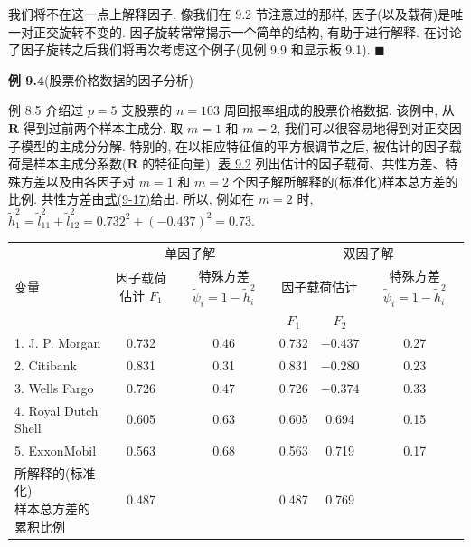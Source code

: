 
我们将不在这一点上解释因子. 像我们在 9.2 节注意过的那样, 因子(以及载荷)是唯一对正交旋转不变的. 因子旋转常常揭示一个简单的结构, 有助于进行解释. 在讨论了因子旋转之后我们将再次考虑这个例子(见例 9.9 和显示板 9.1). \hfill$\blacksquare$

\noindent\textbf{例 9.4}\quad (股票价格数据的因子分析)

例 8.5 介绍过 $p=5$ 支股票的 $n=103$ 周回报率组成的股票价格数据. 该例中, 从 $\mathbf{R}$ 得到过前两个样本主成分. 取 $m=1$ 和 $m=2$, 我们可以很容易地得到对正交因子模型的主成分分解. 特别的, 在以相应特征值的平方根调节之后, 被估计的因子载荷是样本主成分系数($\mathbf{R}$ 的特征向量). \hyperref[tab:9.2]{表 9.2} 列出估计的因子载荷、共性方差、特殊方差以及由各因子对 $m=1$ 和 $m=2$ 个因子解所解释的(标准化)样本总方差的比例. 共性方差由\hyperref[eq:9-17]{式(9-17)}给出. 所以, 例如在 $m=2$ 时, $\tilde{h}_1^2=\tilde{l}_{11}^2+\tilde{l}_{12}^2=0.732^2+(-0.437)^2=0.73$.

\begin{mvtable}
\label{tab:9.2}
\begin{tabular}{lccccc}
\toprule
\multirow{3}{*}{变量} & \multicolumn{2}{c}{单因子解} & \multicolumn{3}{c}{双因子解}\\
\cmidrule(lr){2-3}\cmidrule(lr){4-6}
& \makecell{因子载荷估计\\$F_1$} & \makecell{特殊方差\\$\tilde{\psi}_i=1-\tilde{h}_i^2$} & \multicolumn{2}{c}{因子载荷估计} & \makecell{特殊方差\\$\tilde{\psi}_i=1-\tilde{h}_i^2$}\\
\cmidrule(lr){4-5}
& & & $F_1$ & $F_2$ & \\
\midrule
1. J. P. Morgan & 0.732 & 0.46 & 0.732 & $-0.437$ & 0.27\\
2. Citibank & 0.831 & 0.31 & 0.831 & $-0.280$ & 0.23\\
3. Wells Fargo & 0.726 & 0.47 & 0.726 & $-0.374$ & 0.33\\
4. Royal Dutch Shell & 0.605 & 0.63 & 0.605 & 0.694 & 0.15\\
5. ExxonMobil & 0.563 & 0.68 & 0.563 & 0.719 & 0.17\\
\midrule
\makecell[l]{所解释的(标准化)\\样本总方差的\\累积比例} & 0.487 & & 0.487 & 0.769 & \\
\bottomrule
\end{tabular}
\end{mvtable}

